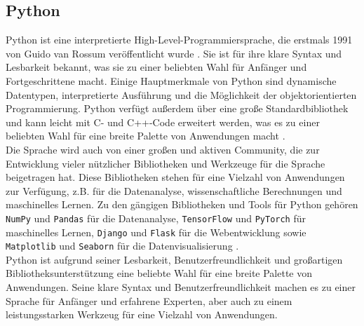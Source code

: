 \subsection{Python}\label{subsec:Python}
Python ist eine interpretierte High-Level-Programmiersprache, die erstmals 1991 von Guido van Rossum veröffentlicht wurde \cite{wiki-python}. Sie ist für ihre klare Syntax und Lesbarkeit bekannt, was sie zu einer beliebten Wahl für Anfänger und Fortgeschrittene macht. Einige Hauptmerkmale von Python sind dynamische Datentypen, interpretierte Ausführung und die Möglichkeit der objektorientierten Programmierung. Python verfügt außerdem über eine große Standardbibliothek und kann leicht mit C- und C++-Code erweitert werden, was es zu einer beliebten Wahl für eine breite Palette von Anwendungen macht \cite{offical-python}.\\
Die Sprache wird auch von einer großen und aktiven Community, die zur Entwicklung vieler nützlicher Bibliotheken und Werkzeuge für die Sprache beigetragen hat. Diese Bibliotheken stehen für eine Vielzahl von Anwendungen zur Verfügung, z.B. für die Datenanalyse, wissenschaftliche Berechnungen und maschinelles Lernen. Zu den gängigen Bibliotheken und Tools für Python gehören \texttt{NumPy} und \texttt{Pandas} für die Datenanalyse, \texttt{TensorFlow} und \texttt{PyTorch} für maschinelles Lernen, \texttt{Django} und \texttt{Flask} für die Webentwicklung sowie \texttt{Matplotlib} und \texttt{Seaborn} für die Datenvisualisierung \cite{PythonDataScienceHandbook}.\\
Python ist aufgrund seiner Lesbarkeit, Benutzerfreundlichkeit und großartigen Bibliotheksunterstützung eine beliebte Wahl für eine breite Palette von Anwendungen. Seine klare Syntax und Benutzerfreundlichkeit machen es zu einer Sprache für Anfänger und erfahrene Experten, aber auch zu einem leistungsstarken Werkzeug für eine Vielzahl von Anwendungen.\\

